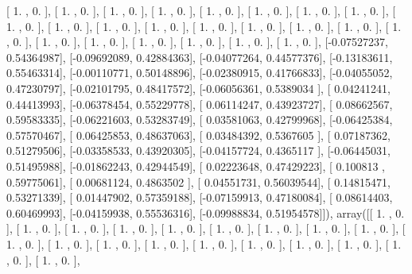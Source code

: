\documentclass{article}
\begin{document}
       [ 1.        ,  0.        ],
       [ 1.        ,  0.        ],
       [ 1.        ,  0.        ],
       [ 1.        ,  0.        ],
       [ 1.        ,  0.        ],
       [ 1.        ,  0.        ],
       [ 1.        ,  0.        ],
       [ 1.        ,  0.        ],
       [ 1.        ,  0.        ],
       [ 1.        ,  0.        ],
       [ 1.        ,  0.        ],
       [ 1.        ,  0.        ],
       [ 1.        ,  0.        ],
       [ 1.        ,  0.        ],
       [ 1.        ,  0.        ],
       [ 1.        ,  0.        ],
       [ 1.        ,  0.        ],
       [ 1.        ,  0.        ],
       [ 1.        ,  0.        ],
       [ 1.        ,  0.        ],
       [ 1.        ,  0.        ],
       [ 1.        ,  0.        ],
       [ 1.        ,  0.        ],
       [-0.07527237,  0.54364987],
       [-0.09692089,  0.42884363],
       [-0.04077264,  0.44577376],
       [-0.13183611,  0.55463314],
       [-0.00110771,  0.50148896],
       [-0.02380915,  0.41766833],
       [-0.04055052,  0.47230797],
       [-0.02101795,  0.48417572],
       [-0.06056361,  0.5389034 ],
       [ 0.04241241,  0.44413993],
       [-0.06378454,  0.55229778],
       [ 0.06114247,  0.43923727],
       [ 0.08662567,  0.59583335],
       [-0.06221603,  0.53283749],
       [ 0.03581063,  0.42799968],
       [-0.06425384,  0.57570467],
       [ 0.06425853,  0.48637063],
       [ 0.03484392,  0.5367605 ],
       [ 0.07187362,  0.51279506],
       [-0.03358533,  0.43920305],
       [-0.04157724,  0.4365117 ],
       [-0.06445031,  0.51495988],
       [-0.01862243,  0.42944549],
       [ 0.02223648,  0.47429223],
       [ 0.100813  ,  0.59775061],
       [ 0.00681124,  0.4863502 ],
       [ 0.04551731,  0.56039544],
       [ 0.14815471,  0.53271339],
       [ 0.01447902,  0.57359188],
       [-0.07159913,  0.47180084],
       [ 0.08614403,  0.60469993],
       [-0.04159938,  0.55536316],
       [-0.09988834,  0.51954578]]), array([[ 1.        ,  0.        ],
       [ 1.        ,  0.        ],
       [ 1.        ,  0.        ],
       [ 1.        ,  0.        ],
       [ 1.        ,  0.        ],
       [ 1.        ,  0.        ],
       [ 1.        ,  0.        ],
       [ 1.        ,  0.        ],
       [ 1.        ,  0.        ],
       [ 1.        ,  0.        ],
       [ 1.        ,  0.        ],
       [ 1.        ,  0.        ],
       [ 1.        ,  0.        ],
       [ 1.        ,  0.        ],
       [ 1.        ,  0.        ],
       [ 1.        ,  0.        ],
       [ 1.        ,  0.        ],
       [ 1.        ,  0.        ],
       [ 1.        ,  0.        ],
\end{document}
